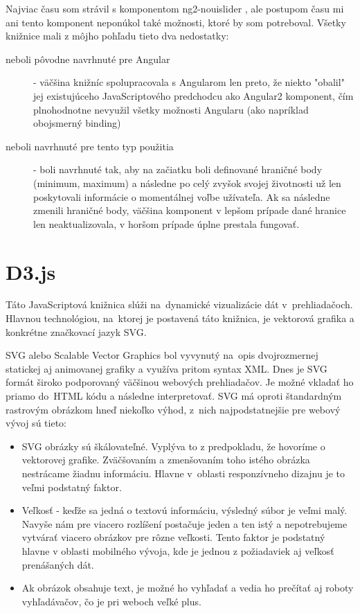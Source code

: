 \documentclass[
  printed, %
  twoside, %
  notable,   %
  nolof,   %
  nolot,   %
]{fithesis3}
\newcommand{\inquotes}[1]{{}"{}#1{}"{}}
\begin{document}
Najviac času som strávil s komponentom ng2-nouislider \cite{ng2nouislider}, ale postupom času mi ani tento komponent neponúkol také možnosti, ktoré by som potreboval. Všetky knižnice mali z môjho pohľadu tieto dva nedostatky:
\begin{description}
\item[neboli pôvodne navrhnuté pre Angular] - väčšina knižníc spolupracovala s Angularom len preto, že niekto \inquotes{obalil} jej existujúceho JavaScriptového predchodcu ako Angular2 komponent, čím plnohodnotne nevyužil všetky možnosti Angularu (ako napríklad obojsmerný binding)
\item[neboli navrhnuté pre tento typ použitia] - boli navrhnuté tak, aby na začiatku boli definované hraničné body (minimum, maximum) a následne po celý zvyšok svojej životnosti už len poskytovali informácie o momentálnej voľbe užívateľa. Ak sa následne zmenili hraničné body, väčšina komponent v lepšom prípade dané hranice len neaktualizovala, v horšom prípade úplne prestala fungovať.
\end{description}

\section{D3.js}
Táto JavaScriptová knižnica slúži na~dynamické vizualizácie dát v~prehliadačoch. Hlavnou technológiou, na~ktorej je postavená táto knižnica, je vektorová grafika a konkrétne značkovací jazyk SVG.

SVG alebo Scalable Vector Graphics bol vyvynutý na~opis dvojrozmernej statickej aj animovanej grafiky a využíva pritom syntax XML\cite{quint2003scalable}.
Dnes je SVG formát široko podporovaný väčšinou webových prehliadačov. Je možné vkladať ho priamo do~HTML kódu a následne interpretovať. SVG má oproti štandardným rastrovým obrázkom hneď niekoľko výhod, z~nich najpodstatnejšie pre webový vývoj sú tieto:
\begin{itemize}
\item SVG obrázky sú škálovateľné. Vyplýva to z predpokladu, že hovoríme o vektorovej grafike. Zväčšovaním a zmenšovaním toho istého obrázka nestrácame žiadnu informáciu. Hlavne v~oblasti responzívneho dizajnu je to veľmi podstatný faktor.
\item Veľkosť - keďže sa jedná o textovú informáciu, výsledný súbor je veľmi malý. Navyše nám pre viacero rozlíšení postačuje jeden a ten istý a nepotrebujeme vytvárať viacero obrázkov pre rôzne veľkosti. Tento faktor je podstatný hlavne v oblasti mobilného vývoja, kde je jednou z požiadaviek aj veľkosť prenášaných dát.
\item Ak obrázok obsahuje text, je možné ho vyhľadať a vedia ho prečítať aj roboty vyhľadávačov, čo je pri weboch veľké plus.
\end{itemize}
\end{document}
